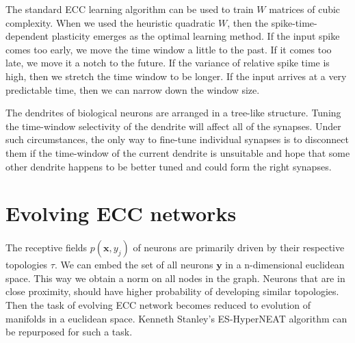\documentclass[12pt]{article}
\begin{document}
The standard ECC learning algorithm can be used to train $W$ matrices of cubic complexity. When we used the heuristic quadratic $W$, then the spike-time-dependent plasticity emerges as the optimal learning method. If the input spike comes too early, we move the time window a little to the past. If it comes too late, we move it a notch to the future. If the variance of relative spike time is high, then we stretch the time window to be longer. If the input arrives at a very predictable time, then we can narrow down the window size. 

The dendrites of biological neurons are arranged in a tree-like structure. Tuning the time-window selectivity of the dendrite will affect all of the synapses. Under such circumstances, the only way to fine-tune individual synapses is to disconnect them if the time-window of the current dendrite is unsuitable and hope that some other dendrite happens to be better tuned and could form the right synapses.	


\section{Evolving ECC networks}

The receptive fields $p(\boldsymbol{x},y_j)$ of neurons are primarily driven by their respective topologies $\tau$. We can embed the set of all neurons $\boldsymbol{y}$ in a n-dimensional euclidean space. This way we obtain a norm on all nodes in the graph. Neurons that are in close proximity, should have higher probability of developing similar topologies. Then the task of evolving ECC network becomes reduced to evolution of manifolds in a euclidean space. Kenneth Stanley's ES-HyperNEAT algorithm can be repurposed for such a task. 



    
\end{document}
